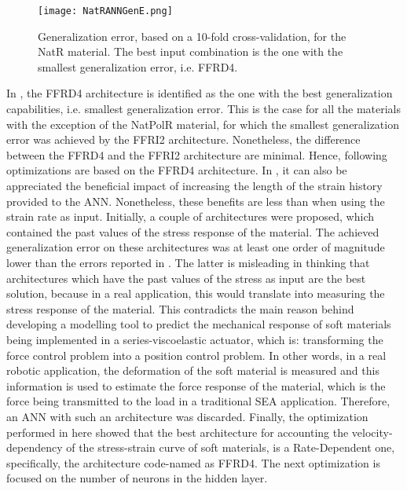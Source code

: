 \begin{figure}[htbp!]
    \centering
    \texttt{[image: NatRANNGenE.png]}
    \caption{Generalization error, based on a 10-fold cross-validation, for the NatR material. The best input combination is the one with the smallest generalization error, i.e. FFRD4.}
    \label{fig:ANNGenNatR}
\end{figure}

In , the FFRD4 architecture is identified as the one with the best generalization capabilities, i.e. smallest generalization error. This is the case for all the materials with the exception of the NatPolR material, for which the smallest generalization error was achieved by the FFRI2 architecture. Nonetheless, the difference between the FFRD4 and the FFRI2 architecture are minimal. Hence, following optimizations are based on the FFRD4 architecture. 
In , it can also be appreciated the beneficial impact of increasing the length of the strain history provided to the ANN. Nonetheless, these benefits are less than when using the strain rate as input. Initially, a couple of architectures were proposed, which contained the past values of the stress response of the material. The achieved generalization error on these architectures was at least one order of magnitude lower than the errors reported in . The latter is misleading in thinking that architectures which have the past values of the stress as input are the best solution, because in a real application, this would translate into measuring the stress response of the material. This contradicts the main reason behind developing a modelling tool to predict the mechanical response of soft materials being implemented in a series-viscoelastic actuator, which is: transforming the force control problem into a position control problem. In other words, in a real robotic application, the deformation of the soft material is measured and this information is used to estimate the force response of the material, which is the force being transmitted to the load in a traditional SEA application. Therefore, an ANN with such an architecture was discarded. Finally, the optimization performed in here showed that the best architecture for accounting the velocity-dependency of the stress-strain curve of soft materials, is a Rate-Dependent one, specifically, the architecture code-named as FFRD4. The next optimization is focused on the number of neurons in the hidden layer.

